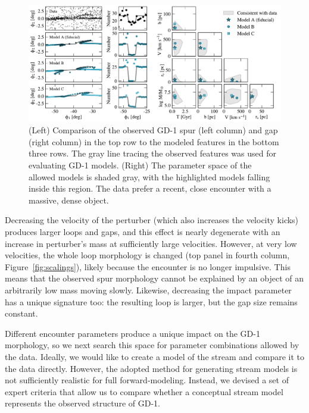 \documentclass[twocolumn]{aastex62}
\begin{document}
\begin{figure}
\begin{center}
\includegraphics[width=\textwidth]{param_search.pdf}
\end{center}
\caption{(Left) Comparison of the observed GD-1 spur (left column) and gap (right column) in the top row to the modeled features in the bottom three rows.
The gray line tracing the observed features was used for evaluating GD-1 models.
(Right) The parameter space of the allowed models is shaded gray, with the highlighted models falling inside this region.
The data prefer a recent, close encounter with a massive, dense object.
}
\label{fig:corner}
\end{figure}

Decreasing the velocity of the perturber (which also increases the velocity kicks) produces larger loops and gaps, and this effect is nearly degenerate with an increase in perturber's mass at sufficiently large velocities.
However, at very low velocities, the whole loop morphology is changed (top panel in fourth column, Figure~\ref{fig:scalings}), likely because the encounter is no longer impulsive.
This means that the observed spur morphology cannot be explained by an object of an arbitrarily low mass moving slowly.
Likewise, decreasing the impact parameter has a unique signature too: the resulting loop is larger, but the gap size remains constant.

Different encounter parameters produce a unique impact on the GD-1 morphology, so we next search this space for parameter combinations allowed by the data.
Ideally, we would like to create a model of the stream and compare it to the data directly.
However, the adopted method for generating stream models is not sufficiently realistic for full forward-modeling.
Instead, we devised a set of expert criteria that allow us to compare whether a conceptual stream model represents the observed structure of GD-1.
\end{document}
